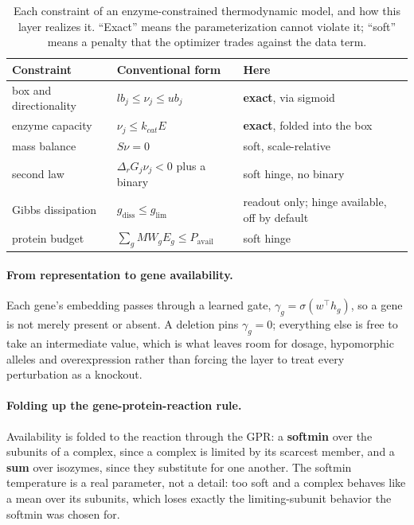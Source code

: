 \begin{table}[H]
  \centering
  \footnotesize
  \caption[The relaxation]{Each constraint of an enzyme-constrained thermodynamic model,
  and how this layer realizes it. ``Exact'' means the parameterization cannot violate it;
  ``soft'' means a penalty that the optimizer trades against the data term.}
  \label{tab:relaxation}
  \begin{tabular}{@{}p{}p{}p{}@{}}
    \hline
    Constraint & Conventional form & Here \\
    \hline
    box and directionality & $lb_j \le \nu_j \le ub_j$ & \textbf{exact}, via sigmoid \\
    enzyme capacity & $\nu_j \le k_{cat} E$ & \textbf{exact}, folded into the box \\
    mass balance & $S\nu = 0$ & soft, scale-relative \\
    second law & $\Delta_r G_j \nu_j < 0$ plus a binary & soft hinge, no binary \\
    Gibbs dissipation & $g_{\mathrm{diss}} \le g_{\mathrm{lim}}$ & readout only; hinge available, off by default \\
    protein budget & $\sum_g MW_g E_g \le P_{\mathrm{avail}}$ & soft hinge \\
    \hline
  \end{tabular}
\end{table}

\paragraph{From representation to gene availability.} Each gene's embedding passes through
a learned gate, $\gamma_g = \sigma(w^\top h_g)$, so a gene is not merely present or absent.
A deletion pins $\gamma_g = 0$; everything else is free to take an intermediate value,
which is what leaves room for dosage, hypomorphic alleles and overexpression rather than
forcing the layer to treat every perturbation as a knockout.

\paragraph{Folding up the gene-protein-reaction rule.} Availability is folded to the
reaction through the GPR: a \textbf{softmin} over the subunits of a complex, since a
complex is limited by its scarcest member, and a \textbf{sum} over isozymes, since they
substitute for one another. The softmin temperature is a real parameter, not a detail: too
soft and a complex behaves like a mean over its subunits, which loses exactly the
limiting-subunit behavior the softmin was chosen for.

